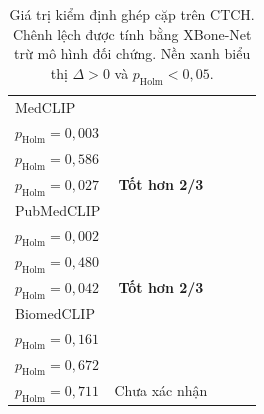\begin{table}[H]
{\begin{tabular}{|l|c|c|c|c|}
MedCLIP & \cellcolor{green!12}\shortstack{\textbf{$+0{,}0583$}\\{\scriptsize $p_{\mathrm{Holm}}=0{,}003$}} & \shortstack{$+0{,}0212$\\{\scriptsize $p_{\mathrm{Holm}}=0{,}586$}} & \cellcolor{green!12}\shortstack{\textbf{$+0{,}0566$}\\{\scriptsize $p_{\mathrm{Holm}}=0{,}027$}} & \cellcolor{green!12}\textbf{Tốt hơn 2/3} \\ \hline
PubMedCLIP & \cellcolor{green!12}\shortstack{\textbf{$+0{,}0663$}\\{\scriptsize $p_{\mathrm{Holm}}=0{,}002$}} & \shortstack{$+0{,}0346$\\{\scriptsize $p_{\mathrm{Holm}}=0{,}480$}} & \cellcolor{green!12}\shortstack{\textbf{$+0{,}0524$}\\{\scriptsize $p_{\mathrm{Holm}}=0{,}042$}} & \cellcolor{green!12}\textbf{Tốt hơn 2/3} \\ \hline
BiomedCLIP & \shortstack{$+0{,}0214$\\{\scriptsize $p_{\mathrm{Holm}}=0{,}161$}} & \shortstack{$-0{,}0088$\\{\scriptsize $p_{\mathrm{Holm}}=0{,}672$}} & \shortstack{$+0{,}0187$\\{\scriptsize $p_{\mathrm{Holm}}=0{,}711$}} & Chưa xác nhận \\ \hline
\end{tabular}%
}
\caption[Giá trị kiểm định ghép cặp trên CTCH]{Giá trị kiểm định ghép cặp trên CTCH. Chênh lệch được tính bằng XBone-Net trừ mô hình đối chứng. Nền xanh biểu thị $\Delta>0$ và $p_{\mathrm{Holm}}<0{,}05$.}
\label{tab:appendix-paired-baseline-classification-ctch}
\end{table}
